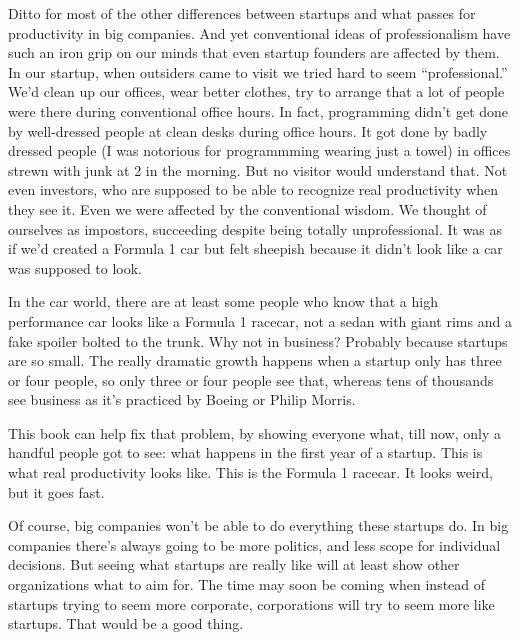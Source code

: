 Ditto for most of the other differences between startups and what passes
for productivity in big companies. And yet conventional ideas of
professionalism have such an iron grip on our minds that even startup
founders are affected by them. In our startup, when outsiders came to
visit we tried hard to seem ``professional.'' We'd clean up our offices,
wear better clothes, try to arrange that a lot of people were there
during conventional office hours. In fact, programming didn't get done
by well-dressed people at clean desks during office hours. It got done
by badly dressed people (I was notorious for programmming wearing just a
towel) in offices strewn with junk at 2 in the morning. But no visitor
would understand that. Not even investors, who are supposed to be able
to recognize real productivity when they see it. Even we were affected
by the conventional wisdom. We thought of ourselves as impostors,
succeeding despite being totally unprofessional. It was as if we'd
created a Formula 1 car but felt sheepish because it didn't look like a
car was supposed to look.

In the car world, there are at least some people who know that a high
performance car looks like a Formula 1 racecar, not a sedan with giant
rims and a fake spoiler bolted to the trunk. Why not in business?
Probably because startups are so small. The really dramatic growth
happens when a startup only has three or four people, so only three or
four people see that, whereas tens of thousands see business as it's
practiced by Boeing or Philip Morris.

This book can help fix that problem, by showing everyone what, till now,
only a handful people got to see: what happens in the first year of a
startup. This is what real productivity looks like. This is the Formula
1 racecar. It looks weird, but it goes fast.

Of course, big companies won't be able to do everything these startups
do. In big companies there's always going to be more politics, and less
scope for individual decisions. But seeing what startups are really like
will at least show other organizations what to aim for. The time may
soon be coming when instead of startups trying to seem more corporate,
corporations will try to seem more like startups. That would be a good
thing.